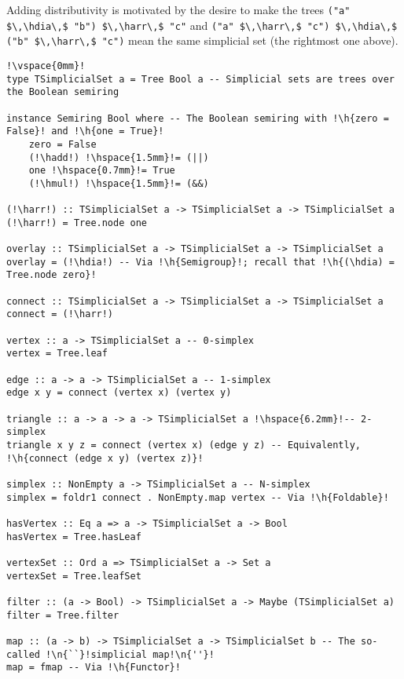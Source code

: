 \documentclass[crc,english]{programming}
\newcommand{\code}[1]{\lstinline[mathescape]|#1|}
\newcommand{\h}[1]{{\itshape\color{grayblue}#1}} %
\newcommand{\n}[1]{{\itshape\color{graygreen}#1}} %
\newcommand{\hadd}{{\large\color{darkblue} $\oplus$}}
\newcommand{\hmul}{{\large\color{darkblue} $\otimes$}}
\newcommand{\hdia}{\,\text{\raisebox{-0.2mm}{\Large\color{darkblue} $\diamond$}}\,}
\newcommand{\harr}{\,\text{\color{darkblue} $\rightarrow$}\,}
\begin{document}
\noindent
Adding distributivity is motivated by the desire to make the trees
\code{("a" $\,\hdia\,$ "b") $\,\harr\,$ "c"} and
\code{("a" $\,\harr\,$ "c") $\,\hdia\,$ ("b" $\,\harr\,$ "c")} mean the same
simplicial set (the rightmost one above).

\begin{lstlisting}[float,label=lst-simplicial-set,xleftmargin=0pt,caption={
    A basic API for working with simplicial sets represented by trees.
},captionpos=t]
!\vspace{0mm}!
type TSimplicialSet a = Tree Bool a -- Simplicial sets are trees over the Boolean semiring

instance Semiring Bool where -- The Boolean semiring with !\h{zero = False}! and !\h{one = True}!
    zero = False
    (!\hadd!) !\hspace{1.5mm}!= (||)
    one !\hspace{0.7mm}!= True
    (!\hmul!) !\hspace{1.5mm}!= (&&)

(!\harr!) :: TSimplicialSet a -> TSimplicialSet a -> TSimplicialSet a
(!\harr!) = Tree.node one

overlay :: TSimplicialSet a -> TSimplicialSet a -> TSimplicialSet a
overlay = (!\hdia!) -- Via !\h{Semigroup}!; recall that !\h{(\hdia) = Tree.node zero}!

connect :: TSimplicialSet a -> TSimplicialSet a -> TSimplicialSet a
connect = (!\harr!)

vertex :: a -> TSimplicialSet a -- 0-simplex
vertex = Tree.leaf

edge :: a -> a -> TSimplicialSet a -- 1-simplex
edge x y = connect (vertex x) (vertex y)

triangle :: a -> a -> a -> TSimplicialSet a !\hspace{6.2mm}!-- 2-simplex
triangle x y z = connect (vertex x) (edge y z) -- Equivalently, !\h{connect (edge x y) (vertex z)}!

simplex :: NonEmpty a -> TSimplicialSet a -- N-simplex
simplex = foldr1 connect . NonEmpty.map vertex -- Via !\h{Foldable}!

hasVertex :: Eq a => a -> TSimplicialSet a -> Bool
hasVertex = Tree.hasLeaf

vertexSet :: Ord a => TSimplicialSet a -> Set a
vertexSet = Tree.leafSet

filter :: (a -> Bool) -> TSimplicialSet a -> Maybe (TSimplicialSet a)
filter = Tree.filter

map :: (a -> b) -> TSimplicialSet a -> TSimplicialSet b -- The so-called !\n{``}!simplicial map!\n{''}!
map = fmap -- Via !\h{Functor}!
\end{lstlisting}
\end{document}
